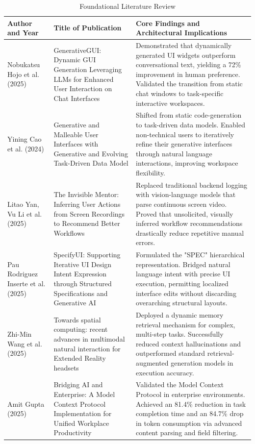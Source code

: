 \documentclass[12pt, a4paper]{report}
\begin{document}
\begin{table}[H]
    \centering
    \caption{Foundational Literature Review}
    \label{tab:literature}
    \begin{tabularx}{\textwidth}{>{\raggedright\arraybackslash}X >{\raggedright\arraybackslash}X >{\raggedright\arraybackslash}X}
    \toprule
    \textbf{Author and Year} & \textbf{Title of Publication} & \textbf{Core Findings and Architectural Implications} \\
    \midrule
    Nobukatsu Hojo et al. (2025) & GenerativeGUI: Dynamic GUI Generation Leveraging LLMs for Enhanced User Interaction on Chat Interfaces & Demonstrated that dynamically generated UI widgets outperform conversational text, yielding a 72\% improvement in human preference. Validated the transition from static chat windows to task-specific interactive workspaces. \\
    \midrule
    Yining Cao et al. (2024) & Generative and Malleable User Interfaces with Generative and Evolving Task-Driven Data Model & Shifted from static code-generation to task-driven data models. Enabled non-technical users to iteratively refine their generative interfaces through natural language interactions, improving workspace flexibility. \\
    \midrule
    Litao Yan, Vu Li et al. (2025) & The Invisible Mentor: Inferring User Actions from Screen Recordings to Recommend Better Workflows & Replaced traditional backend logging with vision-language models that parse continuous screen video. Proved that unsolicited, visually inferred workflow recommendations drastically reduce repetitive manual errors. \\
    \midrule
    Pau Rodriguez Inserte et al. (2025) & SpecifyUI: Supporting Iterative UI Design Intent Expression through Structured Specifications and Generative AI & Formulated the "SPEC" hierarchical representation. Bridged natural language intent with precise UI execution, permitting localized interface edits without discarding overarching structural layouts. \\
    \midrule
    Zhi-Min Wang et al. (2025) & Towards spatial computing: recent advances in multimodal natural interaction for Extended Reality headsets & Deployed a dynamic memory retrieval mechanism for complex, multi-step tasks. Successfully reduced context hallucinations and outperformed standard retrieval-augmented generation models in execution accuracy. \\
    \midrule
    Amit Gupta (2025) & Bridging AI and Enterprise: A Model Context Protocol Implementation for Unified Workplace Productivity & Validated the Model Context Protocol in enterprise environments. Achieved an 81.4\% reduction in task completion time and an 84.7\% drop in token consumption via advanced content parsing and field filtering. \\

\end{tabularx}
\end{table}
\end{document}
